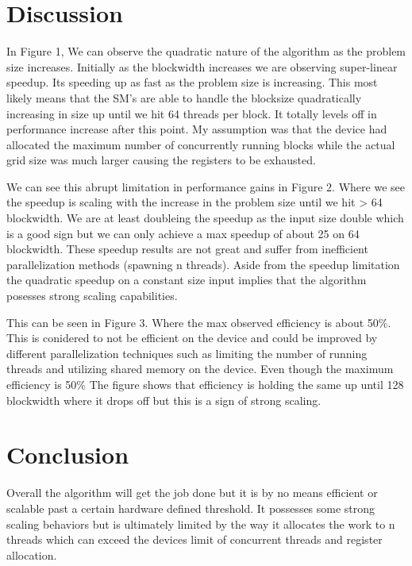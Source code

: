 \documentclass[11pt,a4paper]{article}
\begin{document}
\begin{table}[h!]
    \centering
\end{table}

\section{Discussion}
In Figure 1, We can observe the quadratic nature of the algorithm as the problem size increases. Initially as the blockwidth increases we are observing super-linear speedup. Its speeding up as fast as the problem size is increasing. This most likely means that the SM's are able to handle the blocksize quadratically increasing in size up until we hit 64 threads per block. It totally levels off in performance increase after this point. My assumption was that the device had allocated the maximum number of concurrently running blocks while the actual grid size was much larger causing the registers to be exhausted.

We can see this abrupt limitation in performance gains in Figure 2. Where we see the speedup is scaling with the increase in the problem size until we hit > 64 blockwidth. We are at least doubleing the speedup as the input size double which is a good sign but we can only achieve a max speedup of about 25 on 64 blockwidth. These speedup results are not great and suffer from inefficient parallelization methods (spawning n threads). Aside from the speedup limitation the quadratic speedup on a constant size input implies that the algorithm posesses strong scaling capabilities.

This can be seen in Figure 3. Where the max observed efficiency is about 50\%. This is conidered to not be efficient on the device and could be improved by different parallelization techniques such as limiting the number of running threads and utilizing shared memory on the device. Even though the maximum efficiency is 50\% The figure shows that efficiency is holding the same up until 128 blockwidth where it drops off but this is a sign of strong scaling.

\section{Conclusion}
Overall the algorithm will get the job done but it is by no means efficient or scalable past a certain hardware defined threshold. It possesses some strong scaling behaviors but is ultimately limited by the way it allocates the work to n threads which can exceed the devices limit of concurrent threads and register allocation. 
\end{document}
